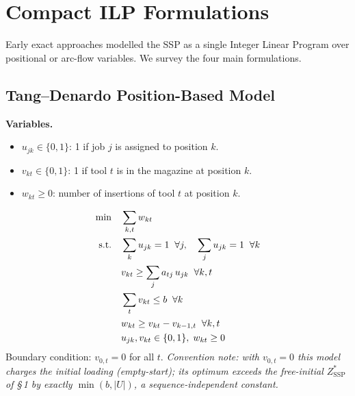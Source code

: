 \documentclass[11pt,a4paper]{article}
\theoremstyle{plain}
\theoremstyle{definition}
\begin{document}
\section{Compact ILP Formulations}
\label{sec:compact}

Early exact approaches modelled the SSP as a single Integer Linear Program over
positional or arc-flow variables. We survey the four main formulations.

\subsection{Tang--Denardo Position-Based Model \cite{Tang1988}}

\noindent\textbf{Variables.}
\begin{itemize}
\item $u_{jk} \in \{0,1\}$: 1 if job $j$ is assigned to position $k$.
\item $v_{kt} \in \{0,1\}$: 1 if tool $t$ is in the magazine at position $k$.
\item $w_{kt} \ge 0$: number of insertions of tool $t$ at position $k$.
\end{itemize}
\begin{align}
\min \quad & \sum_{k,t} w_{kt} \label{eq:td_obj}\\
\text{s.t.}\quad
& \sum_k u_{jk} = 1 \;\;\forall j,\quad
  \sum_j u_{jk} = 1 \;\;\forall k \label{eq:td_perm}\\
& v_{kt} \ge \sum_j a_{tj}\,u_{jk} \;\;\forall k,t \label{eq:td_cov}\\
& \sum_t v_{kt} \le b \;\;\forall k \label{eq:td_cap}\\
& w_{kt} \ge v_{kt} - v_{k-1,t} \;\;\forall k,t \label{eq:td_sw}\\
& u_{jk},v_{kt} \in \{0,1\},\; w_{kt} \ge 0 \notag
\end{align}
Boundary condition: $v_{0,t} = 0$ for all $t$.
\emph{Convention note: with $v_{0,t}=0$ this model charges the initial loading
(empty-start); its optimum exceeds the free-initial $Z^{*}_{\mathrm{SSP}}$ of
\S\,1 by exactly $\min(b,|U|)$, a sequence-independent constant.}
\end{document}
